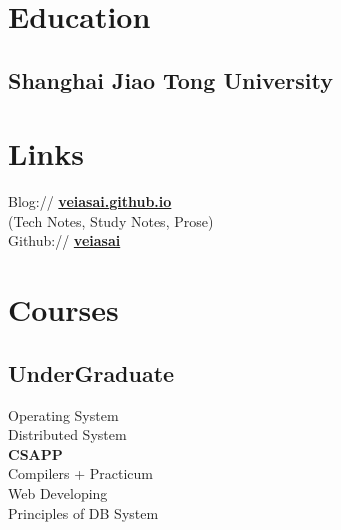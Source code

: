 \documentclass[]{deedy-resume-openfont}
\begin{document}
%
%
\lastupdated

%
%

%
%

\begin{minipage}[t]{0.3\textwidth} 


\section{Education} 
\sectionsep

\subsection{Shanghai Jiao Tong University}
\sectionsep


\section{Links}
\sectionsep
Blog://  \href{http://veiasai.github.io}{\bf veiasai.github.io} \\
(Tech Notes, Study Notes, Prose) \\
Github:// \href{https://github.com/veiasai}{\bf veiasai} \\
\sectionsep


\section{Courses}
\sectionsep
\subsection{UnderGraduate}
Operating System \\
Distributed System \\
\textbf{CSAPP} \\
Compilers + Practicum \\
Web Developing \\
Principles of DB System  \\
\sectionsep


\end{minipage}
\end{document}
